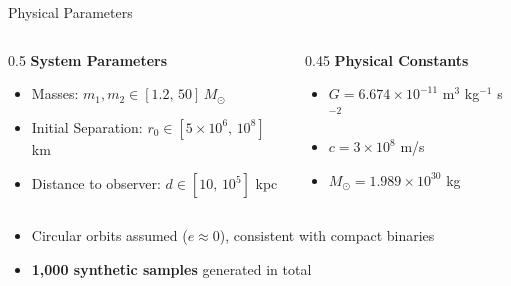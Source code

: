 \documentclass[aspectratio=169]{beamer}
\begin{document}
\begin{frame}{Physical Parameters}
  \begin{columns}
    \begin{column}{0.5\textwidth}
      \textbf{System Parameters}
      \begin{itemize}
        \item Masses: $m_1, m_2 \in [1.2,\,50]\,M_\odot$ 
        \vspace{0.2cm}
        \item Initial Separation: $r_0 \in [5\times10^6,\,10^8]$ km
        \vspace{0.2cm}
        \item Distance to observer: $d \in [10,\,10^5]$ kpc
      \end{itemize}
    \end{column}
    \begin{column}{0.45\textwidth}
      \textbf{Physical Constants}
      \begin{itemize}
        \item $G = 6.674\times10^{-11}$ m$^3$ kg$^{-1}$ s$^{-2}$
        \item $c = 3\times10^8$ m/s
        \item $M_\odot = 1.989\times10^{30}$ kg
      \end{itemize}
    \end{column}
  \end{columns}
  \vspace{0.8cm}
  \begin{itemize}
    \item Circular orbits assumed ($e \approx 0$), consistent with compact binaries \parencite{Peters1964}
    \vspace{0.2cm}
    \item \textbf{1,000 synthetic samples} generated in total
  \end{itemize}
\end{frame}
\end{document}
